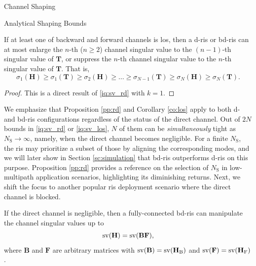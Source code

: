 \documentclass[journal]{IEEEtran}
\begin{document}
\begin{section}{Channel Shaping}
\begin{subsection}{Analytical Shaping Bounds}
		\begin{corollary}
			\label{co:los}
			If at least one of backward and forward channels is \gls{los}, then a \gls{d}-\gls{ris} or \gls{bd}-\gls{ris} can at most enlarge the $n$-th ($n \ge 2$) channel singular value to the $(n-1)$-th singular value of $\mathbf{T}$, or suppress the $n$-th channel singular value to the $n$-th singular value of $\mathbf{T}$.
			That is,
			\begin{equation}
				\label{iq:sv_los}
				\sigma_1(\mathbf{H}) \ge \sigma_1(\mathbf{T}) \ge {\sigma_2(\mathbf{H})} \ge \ldots \ge \sigma_{N-1}(\mathbf{T}) \ge {\sigma_N(\mathbf{H})} \ge \sigma_N(\mathbf{T}).
			\end{equation}
		\end{corollary}

		\begin{proof}
			This is a direct result of \eqref{iq:sv_rd} with $k = 1$.
		\end{proof}

		We emphasize that Proposition \ref{pp:rd} and Corollary \ref{co:los} apply to both \gls{d}- and \gls{bd}-\gls{ris} configurations regardless of the status of the direct channel.
		Out of $2N$ bounds in \eqref{iq:sv_rd} or \eqref{iq:sv_los}, $N$ of them can be \emph{simultaneously} tight as $N_\mathrm{S} \to \infty$, namely, when the direct channel becomes negligible.
		For a finite $N_\mathrm{S}$, the \gls{ris} may prioritize a subset of those by aligning the corresponding modes, and we will later show in Section \ref{sc:simulation} that \gls{bd}-\gls{ris} outperforms \gls{d}-\gls{ris} on this purpose.
		Proposition \ref{pp:rd} provides a reference on the selection of $N_\mathrm{S}$ in low-multipath application scenarios, highlighting its diminishing returns.
		Next, we shift the focus to another popular \gls{ris} deployment scenario where the direct channel is blocked.


		\begin{proposition}
			\label{pp:nd}
			If the direct channel is negligible, then a fully-connected \gls{bd}-\gls{ris} can manipulate the channel singular values up to
			\begin{equation}
				\operatorname{sv}(\mathbf{H}) = \operatorname{sv}(\mathbf{BF}),
			\end{equation}
			where $\mathbf{B}$ and $\mathbf{F}$ are arbitrary matrices with $\operatorname{sv}(\mathbf{B})=\operatorname{sv}(\mathbf{H}_\mathrm{B})$ and $\operatorname{sv}(\mathbf{F})=\operatorname{sv}(\mathbf{H}_\mathrm{F})$.
		\end{proposition}


\end{subsection}
\end{section}
\end{document}
